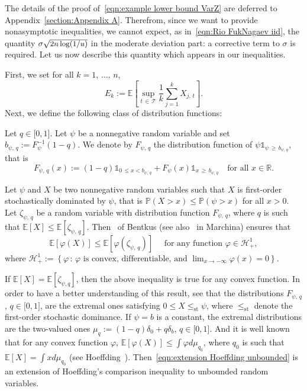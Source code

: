\documentclass[AHL,Unicode,longabstracts,published]{cedram}
\newcommand{\bE}{\mathbb{E}}
\newcommand{\bP}{\mathbb{P}}
\newcommand{\bR}{\mathbb{R}}
\newcommand{\cH}{\mathcal{H}}
\newcommand{\cT}{\mathcal{T}}
\newcommand{\intervalleff}[2]{\mathopen{[} #1\mathclose{}\mathpunct{},#2\mathclose{]}}
\newcommand{\ind}{\mathds{1}}
\begin{document}
The details of the proof of~\eqref{eqn:example lower bound VarZ} are deferred to Appendix~\ref{section:Appendix A}. Therefrom, since we want to provide nonasymptotic inequalities, we cannot expect, as in~\eqref{eqn:Rio FukNagaev iid}, the quantity $\sigma\sqrt{\text{\small{$2n\log(1/u)$}}}$ in the moderate deviation part: a corrective term to $\sigma$ is required. Let us now describe this quantity which appears in our inequalities.

First, we set for all $k=1,\,\ldots,\,n$,
\begin{equation}\label{eqn:def E_k}
E_k:=\bE\left[\sup_{t\,\in\,\cT}\frac 1k\sum_{j=1}^k X_{j,\,t}\right].
\end{equation}
Next, we define the following class of distribution functions:

\begin{defi}\label{def:distrib function}
Let $q\in\intervalleff 01$. Let $\psi$ be a nonnegative random variable and set $b_{\psi,\,q}:=F_\psi^{-1}(1-q)$. We denote by $F_{\psi,\,q}$ the distribution function of $\psi\ind_{\psi\,\geq\,b_{\psi,\,q}}$, that is
\begin{equation}\label{eqn:def distrib function}
F_{\psi,\,q}(x):=(1-q)\ind_{0\,\leq x < b_{\psi,\,q}} + F_{\psi}(x)\ind_{x\,\geq\,b_{\psi,\,q}}\quad\text{for all }x\in\bR.
\end{equation}
\end{defi}

Let $\psi$ and $X$ be two nonnegative random variables such that $X$ is first-order stochastically dominated by $\psi$, that is $\bP(X> x)\leq \bP(\psi>x)$ for all $x>0$. Let $\zeta_{\psi,\,q}$ be a random variable with distribution function $F_{\psi,\,q}$, where $q$ is such that $\bE[X]\leq\bE[\zeta_{\psi,\,q}]$. Then~\cite[Lemma~1]{Bentkus08a} of Bentkus (see also~\cite[Lemma~4.3]{Marchina18a} in Marchina) ensures that
\begin{equation}\label{eqn:extension Hoeffding unbounded}
\bE[\varphi(X)]\leq\bE[\varphi(\zeta_{\psi,\,q})]\quad\text{ for any function }\varphi\in\cH_+^1,
\end{equation}
where $\cH_+^1:=\left\{\varphi\, :\,\varphi\text{ is convex, differentiable, and }\lim_{x\to-\infty}\varphi(x)=0\right\}$.

If $\bE[X]=\bE[\zeta_{\psi, q}]$, then the above inequality is true for any convex function. In order to have a better understanding of this result, see that the distributions $F_{\psi,\,q}$, $q\in\intervalleff 01$, are the extremal ones satisfying $0\leq X\leq_{\text{st}} \psi$, where $\leq_{\text{st}}$ denote the first-order stochastic dominance. If $\psi=b$ is a constant, the extremal distributions are the two-valued ones $\mu_q:=(1-q)\delta_0+q\delta_b$, $q\in\intervalleff 01$. And it is well known that for any convex function $\varphi$, $\bE[\varphi(X)]\leq \int \varphi d\mu_{q_0}$, where $q_0$ is such that $\bE[X]=\int xd\mu_{q_0}$ (see Hoeffding~\cite{Hoeffding63}). Then~\eqref{eqn:extension Hoeffding unbounded} is an extension of Hoeffding's comparison inequality to unbounded random variables.
\end{document}

